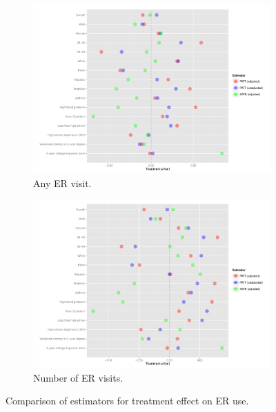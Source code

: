 \documentclass[12pt]{article}
\begin{document}
\begin{figure}
\begin{center}
  \begin{subfigure}[b]{0.86\textwidth}
    \includegraphics[width=\textwidth]{any-visit-plot.pdf}
    \caption{Any ER visit.}
    \label{fig:any-visit-plot}
  \end{subfigure}
  \begin{subfigure}[b]{0.86\textwidth}
    \includegraphics[width=\textwidth]{num-visit-plot.pdf}
    \caption{Number of ER visits.}
    \label{fig:num-visit-plot}
  \end{subfigure}
 \caption{Comparison of estimators for treatment effect on ER use.}
  \end{center}
\end{figure}
\end{document}
